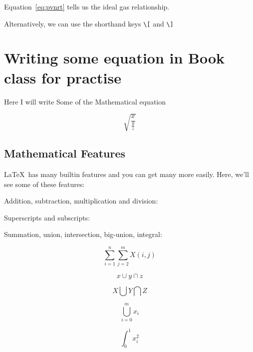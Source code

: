\documentclass{book}
\begin{document}
Equation~\ref{eq:pvnrt} tells us the ideal gas relationship.

Alternatively, we can use the shorthand keys \verb|\[| and \verb|\]|


\chapter{Writing some equation in Book class for practise}

Here I will write Some of the Mathematical equation

\begin{equation}
\sqrt{\frac{x}{\frac{y}{z}}}
\end{equation}








\section{Mathematical Features}
\LaTeX\ has many builtin features and you can get many more easily. Here, we'll see some of these features: 

Addition, subtraction, multiplication and division: 


Superscripts and subscripts: 



Summation, union, intersection, big-union, integral: 

\begin{equation}\label{eq:summ}
\sum_{i=1}^{n} \sum_{j=2}^{m} X(i,j)
\end{equation}

\begin{equation}\label{eq:union}
 x \cup y \cap z
\end{equation}


\begin{equation}\label{eq:union}
X \bigcup Y \bigcap Z
\end{equation}


\begin{equation}\label{eq:bigcup}
\bigcup_{i=0}^{m} x_i
\end{equation}

\begin{equation}\label{eq:int1}
\int_0^1 x_i^2
\end{equation}
\end{document}
